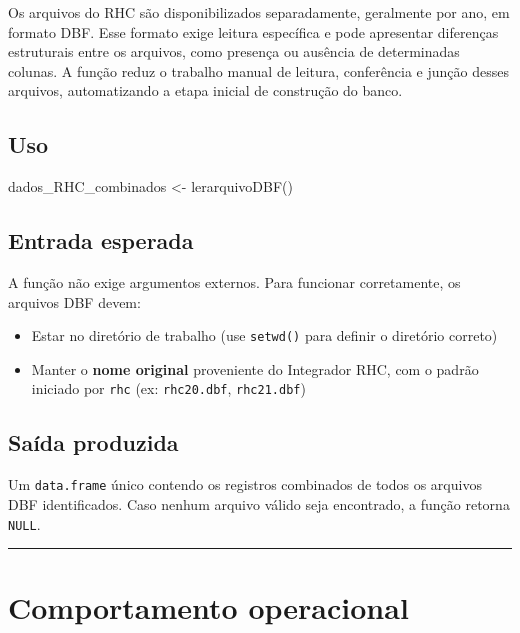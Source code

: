 \documentclass[
  brazilian,
  a4paper,
  oneside]{scrbook}
\newenvironment{Shaded}{\begin{snugshade}}{\end{snugshade}}
\newcommand{\FunctionTok}[1]{\textcolor[rgb]{0.28,0.35,0.67}{#1}}
\newcommand{\NormalTok}[1]{\textcolor[rgb]{0.00,0.23,0.31}{#1}}
\newcommand{\OtherTok}[1]{\textcolor[rgb]{0.00,0.23,0.31}{#1}}
\providecommand{\tightlist}{%
  \setlength{\itemsep}{0pt}\setlength{\parskip}{0pt}}
\begin{document}
Os arquivos do RHC são disponibilizados separadamente, geralmente por
ano, em formato DBF. Esse formato exige leitura específica e pode
apresentar diferenças estruturais entre os arquivos, como presença ou
ausência de determinadas colunas. A função reduz o trabalho manual de
leitura, conferência e junção desses arquivos, automatizando a etapa
inicial de construção do banco.

\subsection{Uso}\label{uso}

\begin{Shaded}
\begin{Highlighting}[]
\NormalTok{dados\_RHC\_combinados }\OtherTok{\textless{}{-}} \FunctionTok{lerarquivoDBF}\NormalTok{()}
\end{Highlighting}
\end{Shaded}

\subsection{Entrada esperada}\label{entrada-esperada}

A função não exige argumentos externos. Para funcionar corretamente, os
arquivos DBF devem:

\begin{itemize}
\tightlist
\item
  Estar no diretório de trabalho (use \texttt{setwd()} para definir o
  diretório correto)
\item
  Manter o \textbf{nome original} proveniente do Integrador RHC, com o
  padrão iniciado por \texttt{rhc} (ex: \texttt{rhc20.dbf},
  \texttt{rhc21.dbf})
\end{itemize}

\subsection{Saída produzida}\label{sauxedda-produzida}

Um \texttt{data.frame} único contendo os registros combinados de todos
os arquivos DBF identificados. Caso nenhum arquivo válido seja
encontrado, a função retorna \texttt{NULL}.

\begin{center}\rule{0.5\linewidth}{0.5pt}\end{center}

\section{Comportamento operacional}\label{comportamento-operacional}
\end{document}
